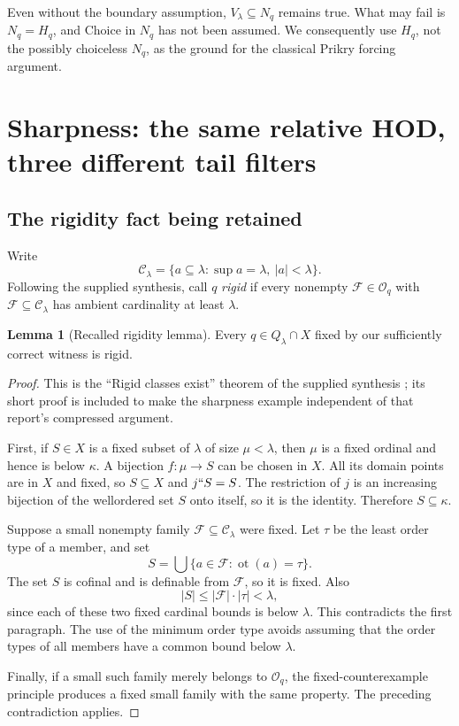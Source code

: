 \documentclass[11pt,letterpaper]{article}
\theoremstyle{definition}
\newtheorem{lemma}[definition]{Lemma}
\numberwithin{equation}{section}
\newcommand{\ot}{\operatorname{ot}}
\begin{document}
Even without the boundary assumption, $V_\lambda\subseteq N_q$ remains true. What may fail is $N_q=H_q$, and Choice in $N_q$ has not been assumed. We consequently use $H_q$, not the possibly choiceless $N_q$, as the ground for the classical Prikry forcing argument.

\section{Sharpness: the same relative HOD, three different tail filters}\label{sec:sharpness}

\subsection{The rigidity fact being retained}

Write
\[
 \mathcal C_\lambda=\{a\subseteq\lambda:\sup a=\lambda,\ |a|<\lambda\}.
\]
Following the supplied synthesis, call $q$ \emph{rigid} if every nonempty $\mathcal F\in\mathcal O_q$ with $\mathcal F\subseteq\mathcal C_\lambda$ has ambient cardinality at least $\lambda$.

\begin{lemma}[Recalled rigidity lemma]\label{lem:rigid}
Every $q\in Q_\lambda\cap X$ fixed by our sufficiently correct witness is rigid.
\end{lemma}

\begin{proof}
This is the ``Rigid classes exist'' theorem of the supplied synthesis \cite[Section~12]{synthesis}; its short proof is included to make the sharpness example independent of that report's compressed argument.

First, if $S\in X$ is a fixed subset of $\lambda$ of size $\mu<\lambda$, then $\mu$ is a fixed ordinal and hence is below $\kappa$. A bijection $f:\mu\to S$ can be chosen in $X$. All its domain points are in $X$ and fixed, so $S\subseteq X$ and $j``S=S$. The restriction of $j$ is an increasing bijection of the wellordered set $S$ onto itself, so it is the identity. Therefore $S\subseteq\kappa$.

Suppose a small nonempty family $\mathcal F\subseteq\mathcal C_\lambda$ were fixed. Let $\tau$ be the least order type of a member, and set
\[
 S=\bigcup\{a\in\mathcal F:\ot(a)=\tau\}.
\]
The set $S$ is cofinal and is definable from $\mathcal F$, so it is fixed. Also
\[
 |S|\le|\mathcal F|\cdot|\tau|<\lambda,
\]
since each of these two fixed cardinal bounds is below $\lambda$. This contradicts the first paragraph. The use of the minimum order type avoids assuming that the order types of all members have a common bound below $\lambda$.

Finally, if a small such family merely belongs to $\mathcal O_q$, the fixed-counterexample principle produces a fixed small family with the same property. The preceding contradiction applies.
\end{proof}
\end{document}
